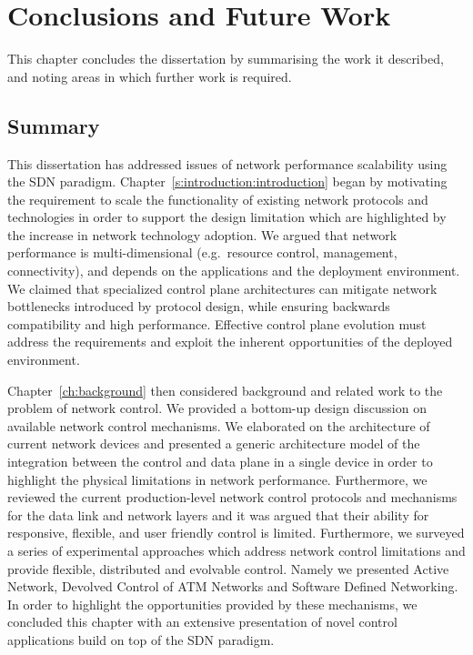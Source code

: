 \def\baselinestretch{1}
\chapter{Conclusions and Future Work} \label{sec:conclusions}

\def\baselinestretch{1.66}

This chapter concludes the dissertation by summarising the work it described,
and noting areas in which further work is required.

\section{Summary}

This dissertation has addressed issues of network performance scalability using
the SDN paradigm.  Chapter~\ref{s:introduction:introduction} began by
motivating the requirement to scale the functionality of existing network
protocols and technologies in order to support the design limitation which are
highlighted by the increase in network technology adoption.  We argued that
network performance is multi-dimensional (e.g.~resource control, management,
connectivity), and depends on the applications and the deployment environment.
We claimed that specialized control plane architectures can mitigate network
bottlenecks introduced by protocol design, while ensuring backwards
compatibility and high performance. Effective control plane evolution must
address the requirements and exploit the inherent opportunities of the deployed
environment. 

Chapter~\ref{ch:background} then considered background and related work to the
problem of network control. We provided a bottom-up design discussion on
available network control mechanisms. We elaborated on the architecture of
current network devices and presented a generic architecture model of the integration
between the control and data plane in a single device in order to highlight the
physical limitations in  network performance. Furthermore, we reviewed
the current production-level network control protocols and mechanisms for the
data link and network layers and it was argued that their ability for responsive,
flexible, and user friendly control is limited. Furthermore, we surveyed a
series of experimental approaches which address network control limitations and
provide flexible, distributed and evolvable control.  Namely we presented Active
Network, Devolved Control of ATM Networks and Software Defined Networking. In
order to highlight the opportunities provided by these mechanisms, we concluded
this chapter with an extensive presentation of novel control applications build
on top of the SDN paradigm. 

